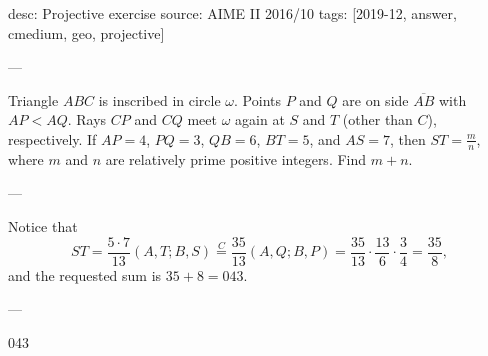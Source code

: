 desc: Projective exercise
source: AIME II 2016/10
tags: [2019-12, answer, cmedium, geo, projective]

---

Triangle $ABC$ is inscribed in circle $\omega$. Points $P$ and $Q$ are on side $\overline{AB}$ with $AP<AQ$. Rays $CP$ and $CQ$ meet $\omega$ again at $S$ and $T$ (other than $C$), respectively. If $AP=4$, $PQ=3$, $QB=6$, $BT=5$, and $AS=7$, then $ST=\tfrac{m}{n}$, where $m$ and $n$ are relatively prime positive integers. Find $m+n$.

---

Notice that \[ST=\frac{5\cdot 7}{13}(A,T;B,S)\stackrel{C}{=}\frac{35}{13}(A,Q;B,P)=\frac{35}{13}\cdot\frac{13}6\cdot\frac34=\frac{35}8,\]
and the requested sum is $35+8=043$.

---

043
